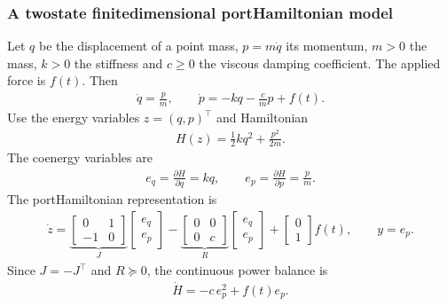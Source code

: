 \documentclass[letterpaper,10pt,english]{sphinxmanual}
\begin{document}
\subsubsection{A two\sphinxhyphen{}state finite\sphinxhyphen{}dimensional port\sphinxhyphen{}Hamiltonian model}
\label{\detokenize{examples/mass_spring_damper:a-two-state-finite-dimensional-port-hamiltonian-model}}\label{\detokenize{examples/mass_spring_damper:id1}}
\sphinxAtStartPar
Let \(q\) be the displacement of a point mass, \(p=m\dot q\)
its momentum, \(m>0\) the mass, \(k>0\) the stiffness and
\(c\geq0\) the viscous damping coefficient. The applied force
is \(f(t)\). Then
\begin{equation*}
\begin{split}\dot q = \frac{p}{m},\qquad
\dot p = -kq-\frac{c}{m}p+f(t).\end{split}
\end{equation*}
\sphinxAtStartPar
Use the energy variables \(z=(q,p)^\top\) and Hamiltonian
\begin{equation*}
\begin{split}H(z)=\frac12 kq^2+\frac{p^2}{2m}.\end{split}
\end{equation*}
\sphinxAtStartPar
The co\sphinxhyphen{}energy variables are
\begin{equation*}
\begin{split}e_q=\frac{\partial H}{\partial q}=kq,\qquad
e_p=\frac{\partial H}{\partial p}=\frac{p}{m}.\end{split}
\end{equation*}
\sphinxAtStartPar
The port\sphinxhyphen{}Hamiltonian representation is
\begin{equation*}
\begin{split}\dot z =
\underbrace{\begin{bmatrix}0&1\\-1&0\end{bmatrix}}_{J}
\begin{bmatrix}e_q\\e_p\end{bmatrix}
-\underbrace{\begin{bmatrix}0&0\\0&c\end{bmatrix}}_{R}
\begin{bmatrix}e_q\\e_p\end{bmatrix}
+\begin{bmatrix}0\\1\end{bmatrix}f(t),\qquad
y=e_p.\end{split}
\end{equation*}
\sphinxAtStartPar
Since \(J=-J^\top\) and \(R\succeq0\), the continuous
power balance is
\begin{equation*}
\begin{split}\dot H=-c\,e_p^2+f(t)e_p.\end{split}
\end{equation*}
\end{document}
